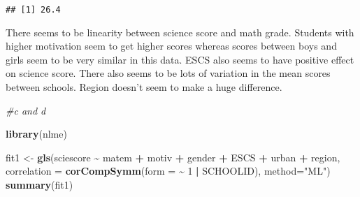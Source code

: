 \documentclass[
]{article}
\newenvironment{Shaded}{\begin{snugshade}}{\end{snugshade}}
\newcommand{\AttributeTok}[1]{\textcolor[rgb]{0.13,0.29,0.53}{#1}}
\newcommand{\CommentTok}[1]{\textcolor[rgb]{0.56,0.35,0.01}{\textit{#1}}}
\newcommand{\DecValTok}[1]{\textcolor[rgb]{0.00,0.00,0.81}{#1}}
\newcommand{\FunctionTok}[1]{\textcolor[rgb]{0.13,0.29,0.53}{\textbf{#1}}}
\newcommand{\NormalTok}[1]{#1}
\newcommand{\OtherTok}[1]{\textcolor[rgb]{0.56,0.35,0.01}{#1}}
\newcommand{\SpecialCharTok}[1]{\textcolor[rgb]{0.81,0.36,0.00}{\textbf{#1}}}
\newcommand{\StringTok}[1]{\textcolor[rgb]{0.31,0.60,0.02}{#1}}
\begin{document}
\begin{verbatim}
## [1] 26.4
\end{verbatim}

There seems to be linearity between science score and math grade.
Students with higher motivation seem to get higher scores whereas scores
between boys and girls seem to be very similar in this data. ESCS also
seems to have positive effect on science score. There also seems to be
lots of variation in the mean scores between schools. Region doesn't
seem to make a huge difference.

\begin{Shaded}
\begin{Highlighting}[]
\CommentTok{\#c and d}

\FunctionTok{library}\NormalTok{(nlme)}

\NormalTok{fit1 }\OtherTok{\textless{}{-}} \FunctionTok{gls}\NormalTok{(sciescore }\SpecialCharTok{\textasciitilde{}}\NormalTok{ matem }\SpecialCharTok{+}\NormalTok{ motiv }\SpecialCharTok{+}\NormalTok{ gender }\SpecialCharTok{+}\NormalTok{ ESCS }\SpecialCharTok{+}\NormalTok{ urban }\SpecialCharTok{+}\NormalTok{ region,}
            \AttributeTok{correlation =} \FunctionTok{corCompSymm}\NormalTok{(}\AttributeTok{form =} \SpecialCharTok{\textasciitilde{}} \DecValTok{1} \SpecialCharTok{|}\NormalTok{ SCHOOLID),}
            \AttributeTok{method=}\StringTok{"ML"}\NormalTok{)}
\FunctionTok{summary}\NormalTok{(fit1)}
\end{Highlighting}
\end{Shaded}
\end{document}
